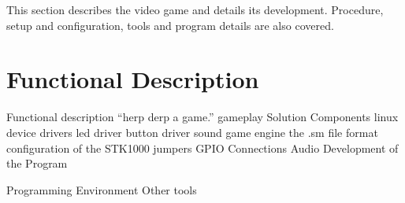 This section describes the video game and details its development. Procedure, setup and configuration, tools and program details are also covered.
\section{Functional Description}
	
	
Functional description
	``herp derp a game.''
	gameplay
Solution Components
	linux device drivers
		led driver
		button driver
	sound
	game engine
	the .sm file format
configuration of the STK1000
	jumpers
	GPIO Connections
	Audio
Development of the Program

Programming Environment
	Other tools